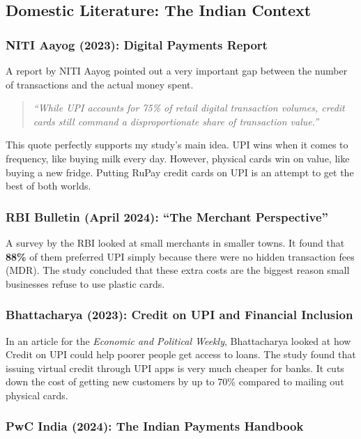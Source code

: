 \subsection{Domestic Literature: The Indian Context}

\subsubsection{NITI Aayog (2023): Digital Payments Report}

A report by NITI Aayog pointed out a very important gap between the number of transactions and the actual money spent.

\begin{quote}
    \textit{``While UPI accounts for 75\% of retail digital transaction volumes, credit cards still command a disproportionate share of transaction value.''}
\end{quote}

This quote perfectly supports my study's main idea. UPI wins when it comes to frequency, like buying milk every day. However, physical cards win on value, like buying a new fridge. Putting RuPay credit cards on UPI is an attempt to get the best of both worlds.

\subsubsection{RBI Bulletin (April 2024): ``The Merchant Perspective''}

A survey by the RBI looked at small merchants in smaller towns. It found that \textbf{88\%} of them preferred UPI simply because there were no hidden transaction fees (MDR). The study concluded that these extra costs are the biggest reason small businesses refuse to use plastic cards.

\subsubsection{Bhattacharya (2023): Credit on UPI and Financial Inclusion}

In an article for the \textit{Economic and Political Weekly}, Bhattacharya looked at how Credit on UPI could help poorer people get access to loans. The study found that issuing virtual credit through UPI apps is very much cheaper for banks. It cuts down the cost of getting new customers by up to 70\% compared to mailing out physical cards.

\subsubsection{PwC India (2024): The Indian Payments Handbook}

